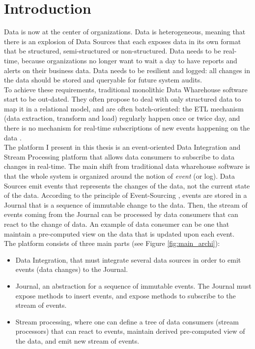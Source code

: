 \chapter{Introduction}

Data is now at the center of organizations. 
Data is heterogeneous, meaning that there is an explosion of Data Sources that each exposes data in its own format 
that be structured, semi-structured or non-structured.
Data needs to be real-time, because organizations no longer want to wait a day to have reports and alerts on their business data.
Data needs to be resilient and logged: all changes in the data should be stored and queryable for future system audits.
\\

To achieve these requirements, traditional monolithic Data Wharehouse software start to be out-dated. They often
propose to deal with only structured data to map it in a relational model, and are often batch-oriented: 
the ETL mechanism (data extraction, transform and load) regularly happen once or twice day, and there is no mechanism 
for real-time subscriptions of new events happening on the data \cite{bib:linkedinLog}.
\\

The platform I present in this thesis is an event-oriented Data Integration and Stream Processing platform that allows data consumers
to subscribe to data changes in real-time. The main shift from traditional data wharehouse software is that the whole
system is organized around the notion of \textit{event} (or log). Data Sources emit events that represents the changes 
of the data, not the current state of the data. According to the principle of Event-Sourcing \cite{bib:eventSourcing}, events
are stored in a Journal that is a sequence of immutable change to the data. Then, the stream of events coming from the Journal 
can be processed by data consumers that can react to the change of data. An example of data consumer can be one that maintain
a pre-computed view on the data that is updated upon each event.
\\

The platform consists of three main parts (see Figure \ref{fig:main_archi}): 

\begin{itemize}
  \item Data Integration, that must integrate several data sources in order to emit 
events (data changes) to the Journal. 
  \item Journal, an abstraction for a sequence of immutable events. The Journal must expose methods to insert events,
  and expose methods to subscribe to the stream of events.
  \item Stream processing, where one can define a tree of data consumers (stream processors) that can react to
  events, maintain derived pre-computed view of the data, and emit new stream of events.
\end{itemize}

